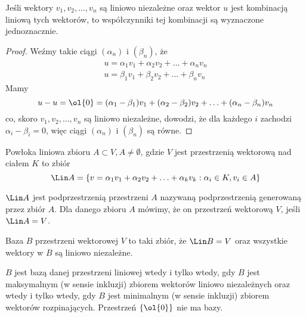 \begin{theorem}
    \label{t:explicit coefficients}
    Jeśli wektory $v_1, v_2, \ldots, v_n$ są liniowo niezależne oraz wektor $u$ jest kombinacją liniową tych wektorów, to współczynniki tej kombinacji są wyznaczone jednoznacznie.
\end{theorem}
\begin{proof}
    Weźmy takie ciągi $(\alpha_n)$ i $(\beta_n)$, że
    \begin{align*}
        u = \alpha_1v_1 + \alpha_2v_2 + \ldots + \alpha_nv_n \\
        u = \beta_1v_1 + \beta_2v_2 + \ldots + \beta_nv_n
    \end{align*}
    Mamy
    \[ u - u = \ol{0} = (\alpha_1 - \beta_1)v_1 + (\alpha_2 - \beta_2)v_2 + \ldots + (\alpha_n - \beta_n)v_n \]
    co, skoro $v_1, v_2, \ldots, v_n$ są liniowo niezależne, dowodzi, że dla każdego $i$ zachodzi $\alpha_i - \beta_i = 0$, więc ciągi $(\alpha_n)$ i $(\beta_n)$ są równe.
\end{proof}

\begin{definition}
    Powłoka liniowa zbioru $A \subset V, A \neq \emptyset$, gdzie $V$ jest przestrzenią wektorową nad ciałem $K$ to zbiór
    \[ \Lin A = \{v = \alpha_1v_1 + \alpha_2v_2 + \ldots + \alpha_kv_k : \alpha_i \in K, v_i \in A\} \]
\end{definition}

$\Lin A$ jest podprzestrzenią przestrzeni $A$ nazywaną podprzestrzenią generowaną przez zbiór $A$. Dla danego zbioru $A$ mówimy, że  on przestrzeń wektorową $V$, jeśli $\Lin A = V$.

\begin{definition}
    Baza $B$ przestrzeni wektorowej $V$ to taki zbiór, że $\Lin B = V$ oraz wszystkie wektory w $B$ są liniowo niezależne.
\end{definition}

$B$ jest bazą danej przestrzeni liniowej wtedy i tylko wtedy, gdy $B$ jest maksymalnym (w sensie inkluzji) zbiorem wektorów liniowo niezależnych oraz wtedy i tylko wtedy, gdy $B$ jest minimalnym (w sensie inkluzji) zbiorem wektorów rozpinających. Przestrzeń $\{\ol{0}\}$ nie ma bazy.

